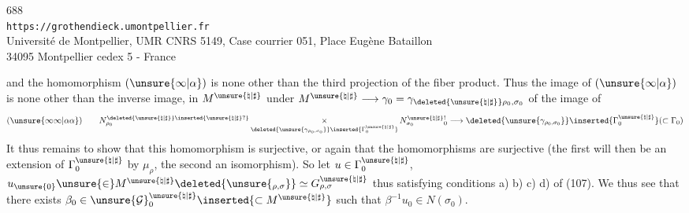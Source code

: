 
\begin{center}
688\\
\texttt{https://grothendieck.umontpellier.fr}\\
Université de Montpellier, UMR CNRS 5149, Case courrier 051, Place Eugène Bataillon\\
34095 Montpellier cedex 5 - France
\end{center}



and the homomorphism $(\unsure{\infty|\alpha})$ is none other than the third projection of the fiber product.
Thus the image of $(\unsure{\infty|\alpha})$ is none other than the inverse image, in $M^{\unsure{\natural|\sharp}}$ under $M^{\unsure{\natural|\sharp}}\longrightarrow\gamma_0=\gamma_{\deleted{\unsure{\natural|\sharp}}\rho_0,\sigma_0}$ of the image of
\[
 (\unsure{\infty\infty|\alpha\alpha})\qquad
 N_{\rho_0}^{\deleted{\unsure{\natural|\sharp}}\inserted{\unsure{\natural|\sharp}?}}
 \mathop{\times}_{\deleted{\unsure{\gamma_{\rho_0,\sigma_0}}}\inserted{\Gamma_0^{\unsure{\natural|\sharp}}}}
 N_{\sigma_0}^{\unsure{\natural|\sharp}}{}_{0}^{!}
 \longrightarrow
 \deleted{\unsure{\gamma_{\rho_0,\sigma_0}}}\inserted{\Gamma_0^{\unsure{\natural|\sharp}}}
 (\subset\Gamma_0)
\]
It thus remains to show that this homomorphism is surjective, or again that the homomorphisms
are surjective (the first will then be an extension of $\Gamma_0^{\unsure{\natural|\sharp}}$ by $\mu_\rho$, the second an isomorphism). So let $u\in\Gamma_0^{\unsure{\natural|\sharp}}$,  $u_{\unsure{0}}\unsure{\in}M^{\unsure{\natural|\sharp}}\deleted{\unsure{_{\rho,\sigma}}}\simeq G_{\rho,\sigma}^{\unsure{\natural|\sharp}}$ thus satisfying conditions a) b) c) d) of (107). We thus see that there exists $\beta_0\in\unsure{\mathcal G}_0^{\unsure{\natural|\sharp}}\inserted{\subset M^{\unsure{\natural|\sharp}}}$ such that $\beta^{-1}u_0\in N(\sigma_0)$.



